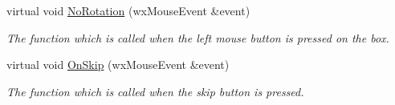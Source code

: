 \begin{DoxyCompactItemize}
virtual void \hyperlink{classGUIFrame_a991f40032c0c8da91776c5b3243e09f4}{NoRotation} (wxMouseEvent \&event)
\begin{DoxyCompactList}\small\item\em The function which is called when the left mouse button is pressed on the box. \item\end{DoxyCompactList}\item 
virtual void \hyperlink{classGUIFrame_a163fdbebaab1119c9c044b82629f74c1}{OnSkip} (wxMouseEvent \&event)
\begin{DoxyCompactList}\small\item\em The function which is called when the skip button is pressed. \item\end{DoxyCompactList}\end{DoxyCompactItemize}
